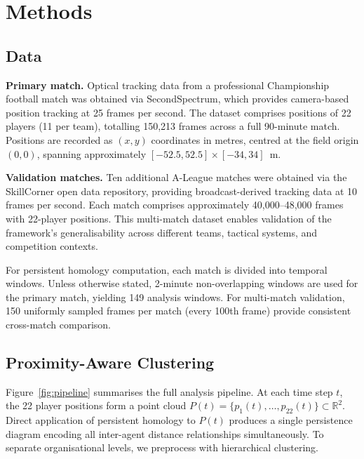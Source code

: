 \section{Methods}
\label{sec:methods}

\subsection{Data}

\textbf{Primary match.} Optical tracking data from a professional Championship football match was obtained via SecondSpectrum, which provides camera-based position tracking at 25 frames per second. The dataset comprises positions of 22 players (11 per team), totalling 150,213 frames across a full 90-minute match. Positions are recorded as \((x,y)\) coordinates in metres, centred at the field origin \((0,0)\), spanning approximately \([-52.5,52.5]\times[-34,34]\)~m.

\textbf{Validation matches.} Ten additional A-League matches were obtained via the SkillCorner open data repository, providing broadcast-derived tracking data at 10 frames per second. Each match comprises approximately 40,000--48,000 frames with 22-player positions. This multi-match dataset enables validation of the framework's generalisability across different teams, tactical systems, and competition contexts.

For persistent homology computation, each match is divided into temporal windows. Unless otherwise stated, 2-minute non-overlapping windows are used for the primary match, yielding 149 analysis windows. For multi-match validation, 150 uniformly sampled frames per match (every 100th frame) provide consistent cross-match comparison.

\subsection{Proximity-Aware Clustering}

Figure~\ref{fig:pipeline} summarises the full analysis pipeline. At each time step \(t\), the 22 player positions form a point cloud \(P(t)=\{p_1(t),\ldots,p_{22}(t)\}\subset\mathbb{R}^2\). Direct application of persistent homology to \(P(t)\) produces a single persistence diagram encoding all inter-agent distance relationships simultaneously. To separate organisational levels, we preprocess with hierarchical clustering.

